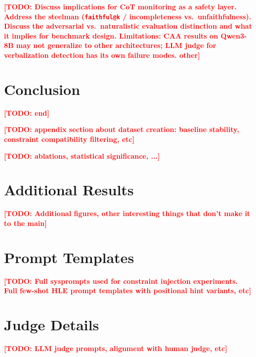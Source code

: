 \documentclass{article}
\newcommand{\todo}[1]{\textbf{\textcolor{red}{[TODO: #1]}}}
\begin{document}
\todo{Discuss implications for CoT monitoring as a safety layer. Address the \citet{zaman2025cot} steelman (\texttt{faithful@k} / incompleteness vs.\ unfaithfulness). Discuss the adversarial vs.\ naturalistic evaluation distinction and what it implies for benchmark design. 
Limitations: CAA results on Qwen3-8B may not generalize to other architectures; LLM judge for verbalization detection has its own failure modes. other}

\section{Conclusion}
\label{sec:conclusion}

\todo{end}

\begin{ack}
\end{ack}




\appendix

\todo{appendix section about dataset creation: baseline stability, constraint compatibility filtering, etc}

\todo{ablations, statistical significance, ...}

\section{Additional Results}
\label{app:results}

\todo{Additional figures, other interesting things that don't make it to the main}

\section{Prompt Templates}
\label{app:prompts}

\todo{Full sysprompts used for constraint injection experiments. Full few-shot HLE prompt templates with positional hint variants, etc}

\section{Judge Details}
\label{app:judge}

\todo{LLM judge prompts, alignment with human judge, etc}
\end{document}
